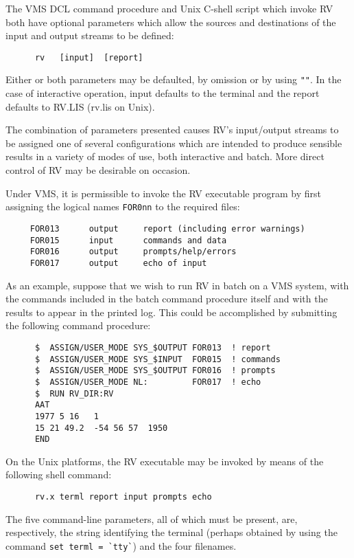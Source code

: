 The VMS DCL command procedure and Unix C-shell script which
invoke RV
both have optional parameters which
allow the sources and destinations of the input and
output streams to be defined:
\begin{verbatim}
      rv   [input]  [report]
\end{verbatim}

Either or both parameters may be defaulted, by omission or by using \verb|""|.
In the case of interactive operation, input defaults to the terminal
and the report defaults to RV.LIS (rv.lis on Unix).

The combination of parameters presented causes RV's
input/output streams to be assigned one of several configurations
which are intended to produce sensible results in a variety
of modes of use, both interactive and batch.
More direct control of RV may be desirable on occasion.

Under VMS, it is permissible to invoke the RV executable program
by first assigning the logical names \verb|FOR0nn| to the required
files:
\begin{verbatim}
     FOR013      output     report (including error warnings)
     FOR015      input      commands and data
     FOR016      output     prompts/help/errors
     FOR017      output     echo of input
\end{verbatim}

As an example, suppose that we wish to run RV in batch on a VMS
system, with
the commands included in the batch command procedure itself
and with the results to appear in the printed log.
This could be accomplished by submitting the following command procedure:
\begin{verbatim}
      $  ASSIGN/USER_MODE SYS_$OUTPUT FOR013  ! report
      $  ASSIGN/USER_MODE SYS_$INPUT  FOR015  ! commands
      $  ASSIGN/USER_MODE SYS_$OUTPUT FOR016  ! prompts
      $  ASSIGN/USER_MODE NL:         FOR017  ! echo
      $  RUN RV_DIR:RV
      AAT
      1977 5 16   1
      15 21 49.2  -54 56 57  1950
      END
\end{verbatim}

On the Unix platforms, the RV executable may be invoked by means of
the following shell command:

\begin{verbatim}
      rv.x terml report input prompts echo
\end{verbatim}

The five command-line parameters, all of which must be present,
are, respectively, the string identifying the terminal (perhaps
obtained by using the command \verb|set terml = `tty`|) and the
four filenames.

